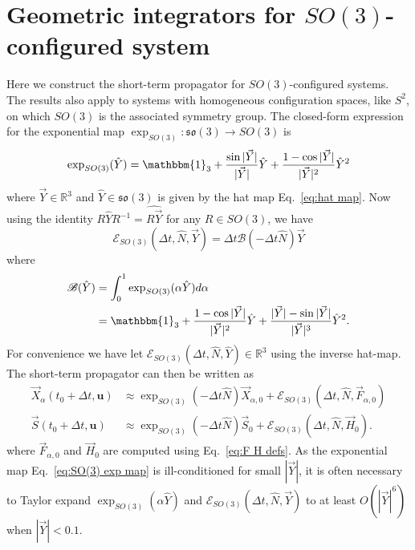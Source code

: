 \section{Geometric integrators for $SO(3)$-configured system} \label{sec:Geometric integrators for SO(3)-valued configuration spaces}

Here we construct the short-term propagator for $SO(3)$-configured systems. The results also apply to systems with homogeneous configuration spaces, like $S^2$, on which $SO(3)$ is the associated symmetry group. The closed-form expression for the exponential map $\exp_{SO(3)} : \mathfrak{so}(3) \to SO(3)$ is \citep{blancoTutorialSETransformation}
\begin{equation}
	\exp_{SO(3)}(\hat{Y}) = \mathbbm{1}_{3}+\frac{\sin|\vec{Y}|}{|\vec{Y}|}\hat{Y}+\frac{1-\cos|\vec{Y}|}{|\vec{Y}|^{2}}\hat{Y}^{2}
\end{equation}
where $\vec{Y} \in \mathbb{R}^3$ and $\hat{Y} \in \mathfrak{so}(3)$ is given by the hat map Eq.~\ref{eq:hat map}. Now using the identity $R \hat{Y} R^{-1} = \widehat{R \vec{Y}}$ for any $R \in SO(3)$, we have
\begin{equation} \label{eq:E-map SO(3)}
	\mathscr{E}_{SO(3)}(\Delta t, \hat{N}, \vec{Y}) = \Delta t \mathscr{B}(- \Delta t \hat{N}) \vec{Y} 
\end{equation}
where
\begin{equation} \label{eq:SO(3) exp map}
\begin{aligned}
	\mathscr{B}(\hat{Y}) & = \int_0^1  \exp_{SO(3)} ( \alpha \hat{Y} ) d \alpha \\
	& = \mathbbm{1}_{3}+\frac{1-\cos|\vec{Y}|}{|\vec{Y}|^{2}}\hat{Y}+\frac{|\vec{Y}|-\sin|\vec{Y}|}{|\vec{Y}|^{3}}\hat{Y}^{2}.
\end{aligned}
\end{equation}
For convenience we have let $\mathscr{E}_{SO(3)}(\Delta t, \hat{N}, \hat{Y}) \in \mathbb{R}^3$ using the inverse hat-map. The short-term propagator can then be written as
\begin{subequations} \label{eq:SO(3) kinodynamic short term propagators}
	\begin{align}
		\vec{X}_{\alpha}(t_0 + \Delta t, \mathbf{u}) & \approx \exp_{SO(3)}( - \Delta t \hat{N} ) \vec{X}_{\alpha, 0} + \mathscr{E}_{SO(3)}(\Delta t, \hat{N}, \vec{F}_{\alpha, 0}) \\
		\vec{S}(t_0 + \Delta t, \mathbf{u}) & \approx \exp_{SO(3)}( - \Delta t \hat{N} ) \vec{S}_0 + \mathscr{E}_{SO(3)}(\Delta t, \hat{N}, \vec{H}_0).
	\end{align}
\end{subequations}
where $\vec{F}_{\alpha, 0}$ and $\vec{H}_0$ are computed using Eq.~\ref{eq:F H defs}. As the exponential map Eq.~\ref{eq:SO(3) exp map} is ill-conditioned for  small $|\vec{Y}|$, it is often necessary to Taylor expand $\exp_{SO(3)} ( \alpha \hat{Y} )$ and $\mathscr{E}_{SO(3)}(\Delta t, \hat{N}, \vec{Y})$ to at least $O(|\vec{Y}|^6)$ when $|\vec{Y}| < 0.1$.

